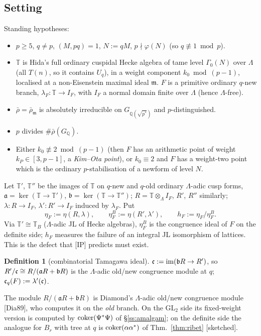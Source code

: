 \documentclass[11pt]{amsart}
\theoremstyle{plain}
\theoremstyle{definition}
\newtheorem{definition}[theorem]{Definition}
\theoremstyle{remark}
\newcommand{\status}[1]{\textup{\textsf{[#1]}}}
\newcommand{\stsketch}{\status{sketched}}
\newcommand{\Q}{\mathbb{Q}}\newcommand{\Z}{\mathbb{Z}}\newcommand{\R}{\mathbb{R}}\newcommand{\C}{\mathbb{C}}
\newcommand{\GL}{\mathrm{GL}}\newcommand{\SL}{\mathrm{SL}}\newcommand{\PGL}{\mathrm{PGL}}
\newcommand{\T}{\mathbb{T}}\newcommand{\m}{\mathfrak{m}}\newcommand{\cT}{\mathcal{T}}\newcommand{\cX}{\mathcal{X}}
\newcommand{\fa}{\mathfrak{a}}\newcommand{\fb}{\mathfrak{b}}
\begin{document}
\subsection{Setting}
Standing hypotheses:
\begin{itemize}
\item[(H0)] $p\ge5$, $q\ne p$, $(M,pq)=1$, $N:=qM$, $p\nmid\varphi(N)$ (so $q\not\equiv1\bmod p$).
\item[(H1)] $\T$ is Hida's full ordinary cuspidal Hecke algebra of tame level $\Gamma_0(N)$ over $\Lambda$ (all $T(n)$, so it contains $U_q$), in a weight component $k_0\bmod(p-1)$, localised at a non-Eisenstein maximal ideal $\m$. $F$ is a primitive ordinary $q$-new branch, $\lambda_F:\T\to I_F$, with $I_F$ a normal domain finite over $\Lambda$ (hence $\Lambda$-free).
\item[(H2)] $\bar\rho=\bar\rho_\m$ is absolutely irreducible on $G_{\Q(\sqrt{p^*})}$ and $p$-distinguished.
\item[(Im)] $p$ divides $\#\bar\rho(G_\Q)$.
\item[(P)] Either $k_0\not\equiv2\bmod(p-1)$ (then $F$ has an arithmetic point of weight $k_P\in[3,p-1]$, a \emph{Kim--Ota point}), or $k_0\equiv2$ and $F$ has a weight-two point which is the ordinary $p$-stabilisation of a newform of level $N$.
\end{itemize}
Let $\T'$, $\T''$ be the images of $\T$ on $q$-new and $q$-old ordinary $\Lambda$-adic cusp forms, $\fa=\ker(\T\to\T')$, $\fb=\ker(\T\to\T'')$; $R=\T\otimes_\Lambda I_F$, $R'$, $R''$ similarly; $\lambda:R\to I_F$, $\lambda':R'\to I_F$ induced by $\lambda_F$. Put
\[\eta_F:=\eta(R,\lambda),\qquad\eta^B_F:=\eta(R',\lambda'),\qquad h_F:=\eta_F/\eta^B_F.\]
Via $\T'\cong\T_B$ ($\Lambda$-adic JL of Hecke algebras), $\eta^B_F$ is the congruence ideal of $F$ on the definite side; $h_F$ measures the failure of an integral JL isomorphism of lattices. This is the defect that [IP] predicts must exist.

\begin{definition}[combinatorial Tamagawa ideal]\label{def:ctam}
$\cc:=\mathrm{im}(\fb R\to R')$, so $R'/\cc\cong R/(\fa R+\fb R)$ is the $\Lambda$-adic old/new congruence module at $q$; $\mathfrak{c}_q(F):=\lambda'(\mathfrak{c})$.
\end{definition}
The module $R/(\fa R+\fb R)$ is Diamond's $\Lambda$-adic old/new congruence module [Dia89], who computes it on the \emph{old} branch. On the $\GL_2$ side its fixed-weight version is computed by $\operatorname{coker}(\Psi^*\Psi)$ of \S\ref{ss:amalgam}; on the definite side the analogue for $B_r$ with tree at $q$ is $\operatorname{coker}(\alpha\alpha^*)$ of Thm.~\ref{thm:ribet} \stsketch.
\end{document}
